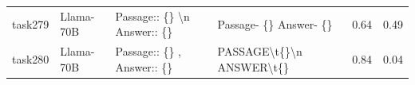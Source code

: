 \begin{longtable}{@{}p{0.8cm\tiny}p{1cm\tiny}p{4.1cm\ttfamily\tiny}p{4.1cm\ttfamily\tiny}p{0.8cm\tiny}p{0.8cm\tiny}@{}}
task279   & Llama-70B  & Passage:: \{\} \textbackslash{}n Answer:: \{\}                                                                                                                                                                                                                                                                                                                                                                                                                                                                          & Passage- \{\} Answer- \{\}                                                                                                                                                                                                                                                                                                                                                                                                                                                                                                                                                        & 0.64 & 0.49 \\
task280   & Llama-70B  & Passage:: \{\} , Answer:: \{\}                                                                                                                                                                                                                                                                                                                                                                                                                                                                                          & PASSAGE\textbackslash{}t\{\}\textbackslash{}n ANSWER\textbackslash{}t\{\}                                                                                                                                                                                                                                                                                                                                                                                                                                                                                                         & 0.84 & 0.04 \\

\end{longtable}
